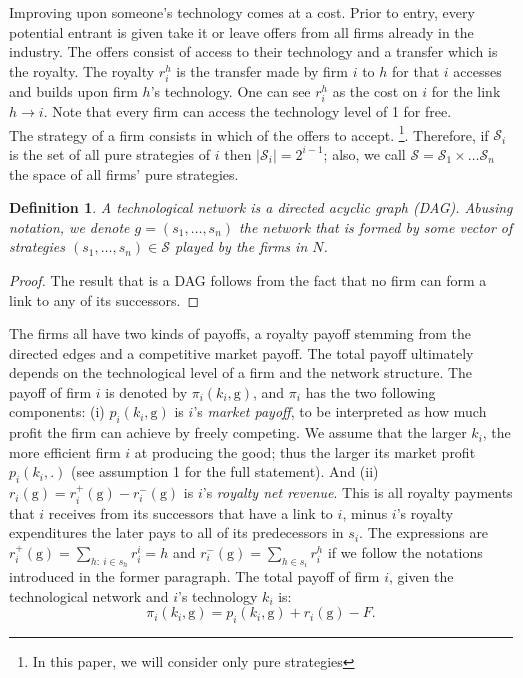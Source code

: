\documentclass{article}
\newtheorem{definition}{Definition}
\begin{document}
\indent Improving upon someone's technology comes at a cost. Prior to entry, every potential entrant is given take it or leave offers from all firms already in the industry. The offers consist of access to their technology and a transfer which is the royalty. The royalty $r^{h}_i$ is the transfer made by firm $i$ to $h$ for that $i$ accesses and builds upon firm $h$'s technology. One can see $r^{h}_i$ as the cost on $i$ for the link $h\rightarrow i$. Note that every firm can access the technology level of 1 for free.\\ 
\indent The strategy of a firm consists in which of the offers to accept. \footnote{In this paper, we will consider only pure strategies}. Therefore, if $\mathcal{S}_i$ is the set of all pure strategies of $i$ then $|\mathcal{S}_i|=2^{i-1}$; also, we call $\mathcal{S}=\mathcal{S}_1\times\ldots \mathcal{S}_n$ the space of all firms' pure strategies.  \\

\begin{definition}
A technological network  is a directed acyclic graph (DAG). Abusing notation, we denote $g=(s_1,\dots, s_n)$ the network that is formed by some vector of strategies $(s_1,\ldots, s_n)\in \mathcal{S}$ played by the firms in $N$. 
\end{definition}
\begin{proof}
The result that  is a DAG follows from the fact that no firm can form a link to any of its successors. 
\end{proof}



\indent The firms all have two kinds of payoffs, a royalty payoff stemming from the directed edges and a competitive market payoff. The total payoff ultimately depends on the technological level of a firm and the network structure. The payoff of firm $i$ is denoted by $\pi_i(k_i,\text{g})$, and $\pi_i$ has the two following components: (i) $p_i(k_i,\text{g})$ is $i$'s \textit{market payoff}, to be interpreted as how much profit the firm can achieve by freely competing. We assume that the larger $k_i$, the more efficient firm $i$ at producing the good; thus the larger its market profit $p_i(k_i,.)$ (see assumption 1 for the full statement). And (ii) $r_i(\text{g})=r_i^+(\text{g})-r_i^-(\text{g})$ is $i$'s \textit{royalty net revenue}. This is all royalty payments that $i$ receives from its successors that have a link to $i$, minus $i$'s royalty expenditures the later pays to all of its predecessors in $s_i$. The expressions are $r^+_i(\text{g})=\sum_{h:~ i\in s_h}r^i_i=h$ and $r^-_i(\text{g})=\sum_{h\in s_i} r^{h}_i$ if we follow the notations introduced in the former paragraph. The total payoff of firm $i$, given the technological network  and $i$'s technology $k_i$ is: 
\begin{equation}
    \pi_i(k_i,\text{g})=p_i(k_i,\text{g})+r_i(\text{g}) -F. 
\end{equation}
\end{document}
